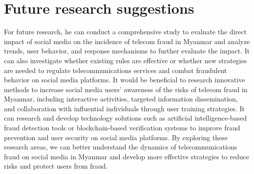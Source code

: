 \documentclass[man,floatsintext]{apa7}
\begin{document}
\section{Future research suggestions}

For future research, he can conduct a comprehensive study to evaluate the direct impact of social media on the incidence of telecom fraud in Myanmar and analyze trends, user behavior, and response mechanisms to further evaluate the impact. It can also investigate whether existing rules are effective or whether new strategies are needed to regulate telecommunications services and combat fraudulent behavior on social media platforms. It would be beneficial to research innovative methods to increase social media users' awareness of the risks of telecom fraud in Myanmar, including interactive activities, targeted information dissemination, and collaboration with influential individuals through user training strategies. It can research and develop technology solutions such as artificial intelligence-based fraud detection tools or blockchain-based verification systems to improve fraud prevention and user security on social media platforms. By exploring these research areas, we can better understand the dynamics of telecommunications fraud on social media in Myanmar and develop more effective strategies to reduce risks and protect users from fraud.

\printbibliography{}
\end{document}
